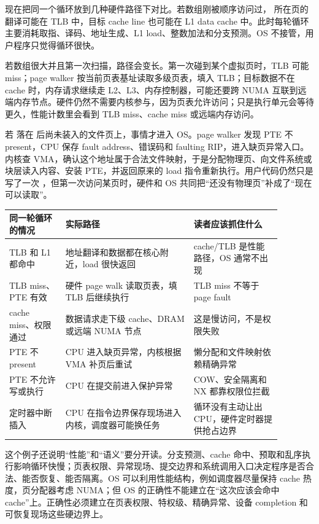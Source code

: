 现在把同一个循环放到几种硬件路径下对比。若数组刚被顺序访问过， 所在页的翻译可能在 TLB 中，目标 cache line 也可能在 L1 data cache 中。此时每轮循环主要消耗取指、译码、地址生成、L1 load、整数加法和分支预测。OS 不接管，用户程序只觉得循环很快。

若数组很大并且第一次扫描，路径会变长。第一次碰到某个虚拟页时，TLB 可能 miss；page walker 按当前页表基址读取多级页表，填入 TLB；目标数据不在 cache 时，内存请求继续走 L2、L3、内存控制器，可能还要跨 NUMA 互联到远端内存节点。硬件仍然不需要内核参与，因为页表允许访问；只是执行单元会等待更久，性能计数里会看到 TLB miss、cache miss 或远端内存访问。

若  落在  后尚未装入的文件页上，事情才进入 OS。page walker 发现 PTE 不 present，CPU 保存 fault address、错误码和 faulting RIP，进入缺页异常入口。内核查 VMA，确认这个地址属于合法文件映射，于是分配物理页、向文件系统或块层读入内容、安装 PTE，并返回原来的 load 指令重新执行。用户代码仍然只是写了一次 ，但第一次访问某页时，硬件和 OS 共同把“还没有物理页”补成了“现在可以读取”。

\begin{longtable}{p{0.18\linewidth}p{0.41\linewidth}p{0.29\linewidth}}
\toprule
同一轮循环的情况 & 实际路径 & 读者应该抓住什么 \\
\midrule
TLB 和 L1 都命中 & 地址翻译和数据都在核心附近，load 很快返回 & cache/TLB 是性能路径，OS 通常不出现 \\
TLB miss、PTE 有效 & 硬件 page walk 读取页表，填 TLB 后继续执行 & TLB miss 不等于 page fault \\
cache miss、权限通过 & 数据请求走下级 cache、DRAM 或远端 NUMA 节点 & 这是慢访问，不是权限失败 \\
PTE 不 present & CPU 进入缺页异常，内核根据 VMA 补页后重试 & 懒分配和文件映射依赖精确异常 \\
PTE 不允许写或执行 & CPU 在提交前进入保护异常 & COW、安全隔离和 NX 都靠权限位拦截 \\
定时器中断插入 & CPU 在指令边界保存现场进入内核，调度器可能换任务 & 循环没有主动让出 CPU，硬件定时器提供抢占边界 \\
\bottomrule
\end{longtable}

这个例子还说明“性能”和“语义”要分开读。分支预测、cache 命中、预取和乱序执行影响循环快慢；页表权限、异常现场、提交边界和系统调用入口决定程序是否合法、能否恢复、能否隔离。OS 可以利用性能结构，例如调度器尽量保持 cache 热度，页分配器考虑 NUMA；但 OS 的正确性不能建立在“这次应该会命中 cache”上。正确性必须建立在页表权限、特权级、精确异常、设备 completion 和可恢复现场这些硬边界上。

